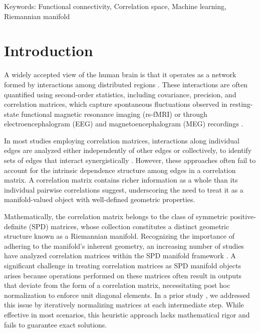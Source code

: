 \documentclass[10pt]{article}
\begin{document}
Keywords: Functional connectivity, Correlation space, Machine learning, Riemannian manifold







\section{Introduction}\label{sec:intro}


A widely accepted view of the human brain is that it operates as a network formed by interactions among distributed regions \citep{park_2013_StructuralFunctionalBrain}. These interactions are often quantified using second-order statistics, including covariance, precision, and correlation matrices, which capture spontaneous fluctuations observed in resting-state functional magnetic resonance imaging (rs-fMRI) \citep{biswal_1995_FunctionalConnectivityMotor} or through electroencephalogram (EEG) and magnetoencephalogram (MEG) recordings \citep{brookes_2011_MeasuringFunctionalConnectivity, cohen_2014_AnalyzingNeuralTime}.

In most studies employing correlation matrices, interactions along individual edges are analyzed either independently of other edges \citep{dosenbach_2010_PredictionIndividualBrain, leonardi_2013_PrincipalComponentsFunctional, siman-tov_2017_EarlyAgeRelatedFunctional} or collectively, to identify sets of edges that interact synergistically \citep{leonardi_2013_PrincipalComponentsFunctional, park_2014_GraphIndependentComponent}. However, these approaches often fail to account for the intrinsic dependence structure among edges in a correlation matrix. A correlation matrix contains richer information as a whole than its individual pairwise correlations suggest, underscoring the need to treat it as a manifold-valued object with well-defined geometric properties.


Mathematically, the correlation matrix belongs to the class of symmetric positive-definite (SPD) matrices, whose collection constitutes a distinct geometric structure known as a Riemannian manifold. Recognizing the importance of adhering to the manifold's inherent geometry, an increasing number of studies have analyzed correlation matrices within the SPD manifold framework \citep{varoquaux_2010_DetectionBrainFunctionalConnectivity, ginestet_2017_HypothesisTestingNetwork, yamin_2019_ComparisonBrainConnectomes, abbas_2021_GeodesicDistanceOptimally}. A significant challenge in treating correlation matrices as SPD manifold objects arises because operations performed on these matrices often result in outputs that deviate from the form of a correlation matrix, necessitating post hoc normalization to enforce unit diagonal elements. In a prior study \citep{you_2021_RevisitingRiemannianGeometry}, we addressed this issue by iteratively normalizing matrices at each intermediate step. While effective in most scenarios, this heuristic approach lacks mathematical rigor and fails to guarantee exact solutions.
\end{document}
